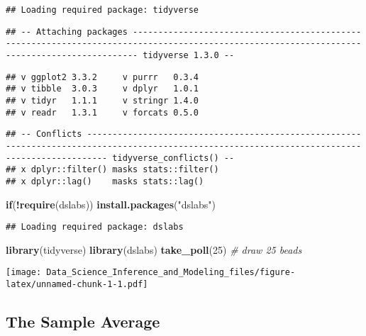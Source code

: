 \documentclass[
]{article}
\newenvironment{Shaded}{\begin{snugshade}}{\end{snugshade}}
\newcommand{\CommentTok}[1]{\textcolor[rgb]{0.56,0.35,0.01}{\textit{#1}}}
\newcommand{\ControlFlowTok}[1]{\textcolor[rgb]{0.13,0.29,0.53}{\textbf{#1}}}
\newcommand{\DecValTok}[1]{\textcolor[rgb]{0.00,0.00,0.81}{#1}}
\newcommand{\KeywordTok}[1]{\textcolor[rgb]{0.13,0.29,0.53}{\textbf{#1}}}
\newcommand{\NormalTok}[1]{#1}
\newcommand{\OperatorTok}[1]{\textcolor[rgb]{0.81,0.36,0.00}{\textbf{#1}}}
\newcommand{\StringTok}[1]{\textcolor[rgb]{0.31,0.60,0.02}{#1}}
\begin{document}
\begin{verbatim}
## Loading required package: tidyverse
\end{verbatim}

\begin{verbatim}
## -- Attaching packages --------------------------------------------------------------------------------------------------------------------------------------------- tidyverse 1.3.0 --
\end{verbatim}

\begin{verbatim}
## v ggplot2 3.3.2     v purrr   0.3.4
## v tibble  3.0.3     v dplyr   1.0.1
## v tidyr   1.1.1     v stringr 1.4.0
## v readr   1.3.1     v forcats 0.5.0
\end{verbatim}

\begin{verbatim}
## -- Conflicts ------------------------------------------------------------------------------------------------------------------------------------------------ tidyverse_conflicts() --
## x dplyr::filter() masks stats::filter()
## x dplyr::lag()    masks stats::lag()
\end{verbatim}

\begin{Shaded}
\begin{Highlighting}[]
\ControlFlowTok{if}\NormalTok{(}\OperatorTok{!}\KeywordTok{require}\NormalTok{(dslabs)) }\KeywordTok{install.packages}\NormalTok{(}\StringTok{"dslabs"}\NormalTok{)}
\end{Highlighting}
\end{Shaded}

\begin{verbatim}
## Loading required package: dslabs
\end{verbatim}

\begin{Shaded}
\begin{Highlighting}[]
\KeywordTok{library}\NormalTok{(tidyverse)}
\KeywordTok{library}\NormalTok{(dslabs)}
\KeywordTok{take\_poll}\NormalTok{(}\DecValTok{25}\NormalTok{)    }\CommentTok{\# draw 25 beads}
\end{Highlighting}
\end{Shaded}

\texttt{[image: Data\_Science\_Inference\_and\_Modeling\_files/figure-latex/unnamed-chunk-1-1.pdf]}

\hypertarget{the-sample-average}{%
\subsection{The Sample Average}\label{the-sample-average}}
\end{document}
